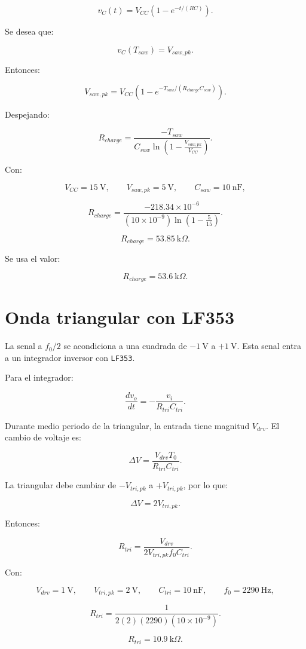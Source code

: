 \documentclass[11pt,letterpaper]{article}
\begin{document}
\[
v_C(t)=V_{CC}\left(1-e^{-t/(RC)}\right).
\]

Se desea que:

\[
v_C(T_{saw})=V_{saw,pk}.
\]

Entonces:

\[
V_{saw,pk}=V_{CC}\left(1-e^{-T_{saw}/(R_{charge}C_{saw})}\right).
\]

Despejando:

\[
R_{charge}=
\frac{-T_{saw}}
{C_{saw}\ln\left(1-\frac{V_{saw,pk}}{V_{CC}}\right)}.
\]

Con:

\[
V_{CC}=15~\text{V},
\qquad
V_{saw,pk}=5~\text{V},
\qquad
C_{saw}=10~\text{nF},
\]

\[
R_{charge}=
\frac{-218.34\times10^{-6}}
{(10\times10^{-9})\ln\left(1-\frac{5}{15}\right)}.
\]

\[
R_{charge}=53.85~\text{k}\Omega.
\]

Se usa el valor:

\[
\boxed{R_{charge}=53.6~\text{k}\Omega}.
\]

\section{Onda triangular con LF353}

La senal a \(f_0/2\) se acondiciona a una cuadrada de \(-1~\text{V}\) a
\(+1~\text{V}\). Esta senal entra a un integrador inversor con \texttt{LF353}.

Para el integrador:

\[
\frac{dv_o}{dt}=-\frac{v_i}{R_{tri}C_{tri}}.
\]

Durante medio periodo de la triangular, la entrada tiene magnitud \(V_{drv}\).
El cambio de voltaje es:

\[
\Delta V=\frac{V_{drv}T_0}{R_{tri}C_{tri}}.
\]

La triangular debe cambiar de \(-V_{tri,pk}\) a \(+V_{tri,pk}\), por lo que:

\[
\Delta V=2V_{tri,pk}.
\]

Entonces:

\[
R_{tri}=
\frac{V_{drv}}
{2V_{tri,pk}f_0C_{tri}}.
\]

Con:

\[
V_{drv}=1~\text{V},
\qquad
V_{tri,pk}=2~\text{V},
\qquad
C_{tri}=10~\text{nF},
\qquad
f_0=2290~\text{Hz},
\]

\[
R_{tri}=
\frac{1}
{2(2)(2290)(10\times10^{-9})}.
\]

\[
\boxed{R_{tri}=10.9~\text{k}\Omega}.
\]
\end{document}
